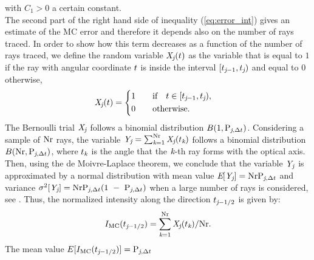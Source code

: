 with $C_1>0$ a certain constant. \\
\indent
The second part of the right hand side of inequality (\ref{eq:error_int}) gives an estimate of the MC error and therefore it depends also on the
number of rays traced.
In order to show how this term decreases as a function of the number of rays traced,
we define the random variable $\textit{X}_{\textit{j}}(t)$ as the variable that is equal to $1$ if the ray with angular coordinate $t$
is inside the interval $[t_{\textit{j}-1}, t_{\textit{j}})$ and equal to $0$ otherwise,
\begin{equation}
\label{radom_variable}
\textit{X}_{\textit{j}}(t) = \begin{cases} \begin{aligned}
1& \qquad \mbox{if} \quad t\in [t_{\textit{j}-1}, t_{\textit{j}}),\\
0 & \qquad \mbox{otherwise}.
\end{aligned}\end{cases}
\end{equation}
The Bernoulli trial $ \textit{X}_{\textit{j}}$ follows a binomial distribution $B(1,\textrm{P}_{\textit{j}, \Delta t})$.
Considering a sample of $\textrm{Nr}$ rays, the variable $\textit{Y}_{\textit{j}} = \sum_{\textit{k}=1}^{\textrm{Nr}} \textit{X}_{\textit{j}}(t_{\textit{k}})$
follows a binomial distribution $B(\textrm{Nr}, \textrm{P}_{\textit{j},\Delta t})$, where $t_{\textit{k}}$ is the angle that the $\textit{k}$-th ray forms
 with the optical axis. Then, using the de Moivre-Laplace theorem, we conclude that the variable $\textit{Y}_{\textit{j}}$ is approximated by a normal distribution with mean value
$\textit{E}[\textit{Y}_{\textit{j}}] = \textrm{Nr}\textrm{P}_{\textit{j}, \Delta t}$ and variance $\sigma^2[\textit{Y}_{\textit{j}}] = \textrm{Nr}\textrm{P}_{\textit{j}, \Delta t}(1~-~\textrm{P}_{\textit{j}, \Delta t})$
when a large number of rays is considered, see \cite{zolotarev1997modern, rubinstein2016simulation}.
Thus, the normalized intensity along the direction $t_{\textit{j}-1/2}$ is given by:
\begin{equation}I_{\textrm{MC}}(t_{\textit{j}-1/2}) = \sum_{\textit{k}=1}^{\textrm{Nr}}\textit{X}_{\textit{j}}(t_{\textit{k}})/\textrm{Nr}.\end{equation}
The mean value $E[I_{\textrm{MC}}(t_{\textit{j}-1/2})]=\textrm{P}_{\textit{j}, \Delta t}$
